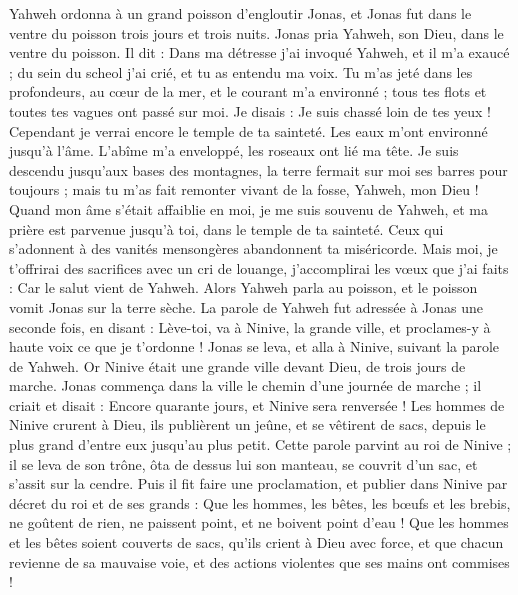 \begin{multicols}{2}
Yahweh ordonna à un grand poisson d’engloutir Jonas, et Jonas fut dans le ventre du poisson trois jours et trois nuits.
\VerseOne{}Jonas pria Yahweh, son Dieu, dans le ventre du poisson.
Il dit : Dans ma détresse j’ai invoqué Yahweh, et il m'a exaucé ; du sein du scheol j’ai crié, et tu as entendu ma voix.
Tu m'as jeté dans les profondeurs, au cœur de la mer, et le courant m'a environné ; tous tes flots et toutes tes vagues ont passé sur moi.
Je disais : Je suis chassé loin de tes yeux ! Cependant je verrai encore le temple de ta sainteté.
Les eaux m'ont environné jusqu'à l'âme. L'abîme m'a enveloppé, les roseaux ont lié ma tête.
Je suis descendu jusqu'aux bases des montagnes, la terre fermait sur moi ses barres pour toujours ; mais tu m’as fait remonter vivant de la fosse, Yahweh, mon Dieu !
Quand mon âme s’était affaiblie en moi, je me suis souvenu de Yahweh, et ma prière est parvenue jusqu’à toi, dans le temple de ta sainteté.
Ceux qui s’adonnent à des vanités mensongères abandonnent ta miséricorde.
Mais moi, je t’offrirai des sacrifices avec un cri de louange, j’accomplirai les vœux que j’ai faits : Car le salut vient de Yahweh.
Alors Yahweh parla au poisson, et le poisson vomit Jonas sur la terre sèche.
\VerseOne{}La parole de Yahweh fut adressée à Jonas une seconde fois, en disant :
Lève-toi, va à Ninive, la grande ville, et proclames-y à haute voix ce que je t'ordonne !
Jonas se leva, et alla à Ninive, suivant la parole de Yahweh. Or Ninive était une grande ville devant Dieu, de trois jours de marche.
Jonas commença dans la ville le chemin d'une journée de marche ; il criait et disait : Encore quarante jours, et Ninive sera renversée !
Les hommes de Ninive crurent à Dieu, ils publièrent un jeûne, et se vêtirent de sacs, depuis le plus grand d'entre eux jusqu'au plus petit.
Cette parole parvint au roi de Ninive ; il se leva de son trône, ôta de dessus lui son manteau, se couvrit d'un sac, et s'assit sur la cendre.
Puis il fit faire une proclamation, et publier dans Ninive par décret du roi et de ses grands : Que les hommes, les bêtes, les bœufs et les brebis, ne goûtent de rien, ne paissent point, et ne boivent point d'eau !
Que les hommes et les bêtes soient couverts de sacs, qu'ils crient à Dieu avec force, et que chacun revienne de sa mauvaise voie, et des actions violentes que ses mains ont commises !

\end{multicols}
